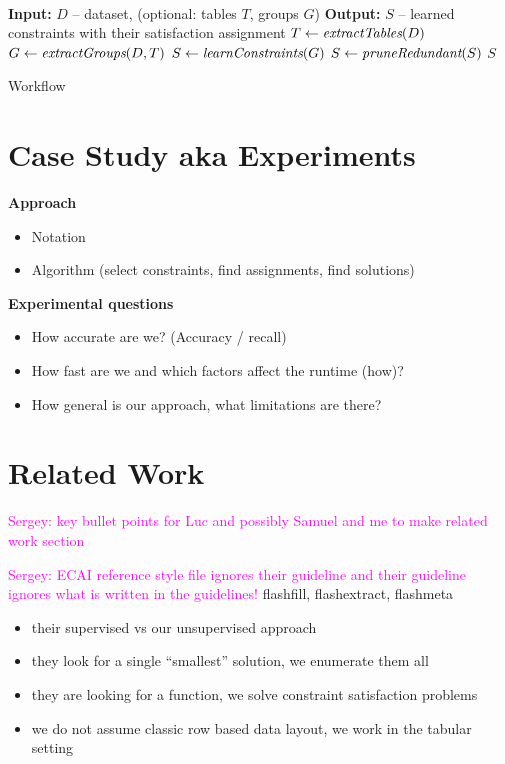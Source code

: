 \documentclass{ecai}
\newcommand{\sergey}[1]{\textcolor{magenta}{{\sc Sergey:} #1}\xspace}
\begin{document}
\paragraph{}

\begin{algorithm}[thb]
  \begin{algorithmic}
    \footnotesize
    \State \textbf{Input:} $D$ -- dataset, (optional: tables $T$, groups $G$)
    \State \textbf{Output:} $S$ -- learned constraints with their satisfaction assignment
      \State $T \gets \textit{extractTables}(D)$
    \EndIf
      \State $G \gets \textit{extractGroups}(D, T)$
    \EndIf
    \State $S \gets \textit{learnConstraints}(G)$
    \State $S \gets \textit{pruneRedundant}(S)$
    \State \Return $S$
\end{algorithmic}
\caption{Workflow}
\label{algo:workflow}
\end{algorithm}

\section{Case Study aka Experiments}

\textbf{Approach}
\begin{itemize}
  \item Notation
  \item Algorithm (select constraints, find assignments, find solutions)
\end{itemize}

{\bfseries 
  Experimental questions
}
\begin{itemize}
  \item  How accurate are we? (Accuracy / recall)
  \item  How fast are we and which factors affect the runtime (how)?
  \item  How general is our approach, what limitations are there?
\end{itemize}


\section{Related Work}
\sergey{key bullet points for Luc and possibly Samuel and me to make related work section}

\sergey{ECAI reference style file ignores their guideline and their guideline ignores what is written in the guidelines!}
flashfill, flashextract, flashmeta \cite{flashfill,flashextract,flashmeta}
\begin{itemize}
  \item their supervised vs our unsupervised approach
  \item they look for a single ``smallest'' solution, we enumerate them all
  \item they are looking for a function, we solve constraint satisfaction problems
  \item we do not assume classic row based data layout, we work in the tabular setting
\end{itemize}
\end{document}
